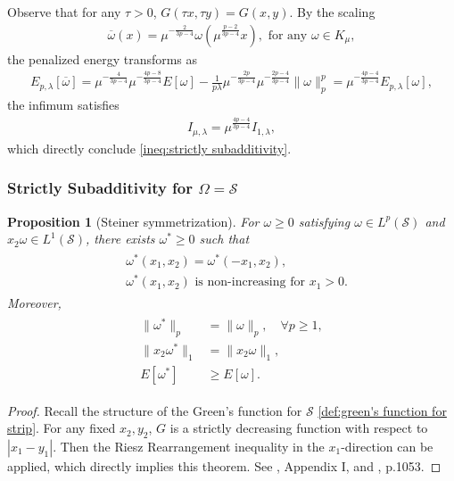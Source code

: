 \documentclass[11pt,letterpaper]{amsart}
\newtheorem{prop}[thm]{Proposition}
\theoremstyle{definition}
\theoremstyle{remark}
\renewcommand{\S}{\mathcal{S}}
\renewcommand{\O}{\Omega}
\renewcommand{\tt}[1]{\text{#1}}
\numberwithin{equation}{section}
\begin{document}
Observe that for any $\tau>0$, $G(\tau x,\tau y)=G(x,y)$. By the scaling 
    \begin{align*}
        \overline\omega(x)=\mu^{-\frac{2}{3p-4}}\omega(\mu^{\frac{p-2}{3p-4}}x), \tt{ for any } \omega \in K_{\mu},
    \end{align*}
    the penalized energy transforms as
    \begin{align*}
        E_{p,\lambda}[\overline\omega]=\mu^{-\frac{4}{3p-4}}\mu^{-\frac{4p-8}{3p-4}}E[\omega]-\frac{1}{p\lambda}\mu^{-\frac{2p}{3p-4}}\mu^{-\frac{2p-4}{3p-4}}\|\omega\|_p^p=\mu^{-\frac{4p-4}{3p-4}}E_{p,\lambda}[\omega],
    \end{align*}
    the infimum satisfies
    \begin{align*}
        I_{\mu,\lambda}=\mu^{\frac{4p-4}{3p-4}}I_{1,\lambda},
    \end{align*}
    which directly conclude \eqref{ineq:strictly subadditivity}.

\rightline{$\Box$}

\subsubsection{Strictly Subadditivity for $\O=\S$}

\begin{prop}[Steiner symmetrization]\label{prop:steiner symmetrization}
For $\omega \ge 0$ satisfying $\omega \in L^p(\S)$ and $x_2\omega \in L^1(\S)$, there exists $\omega^* \ge 0$ such that
\begin{align}
    \begin{aligned}
        &\omega^*(x_1,x_2) = \omega^*(-x_1,x_2), \\
        &\omega^*(x_1,x_2) \text{ is non-increasing for } x_1 > 0.
    \end{aligned}\label{def:symmetry property}
\end{align}
Moreover,
\begin{align}
    \begin{aligned}
        \|\omega^*\|_p &= \|\omega\|_p, \quad \forall p\geq 1, \\
        \|x_2\omega^*\|_1 &= \|x_2\omega\|_1, \\
        E[\omega^*] &\ge E[\omega].
    \end{aligned}
\end{align}
\end{prop}
\begin{proof}
    Recall the structure of the Green's function for $\S$ \eqref{def:green's function for strip}. For any fixed $x_2,y_2$, $G$ is a strictly decreasing function with respect to $|x_1-y_1|$. Then the Riesz Rearrangement inequality in the $x_1$-direction can be applied, which directly implies this theorem. See \cite{Fraenkel1974}, Appendix I, and \cite{TurkingtonBruce1983Osvf}, p.1053.

\end{proof}
\end{document}
